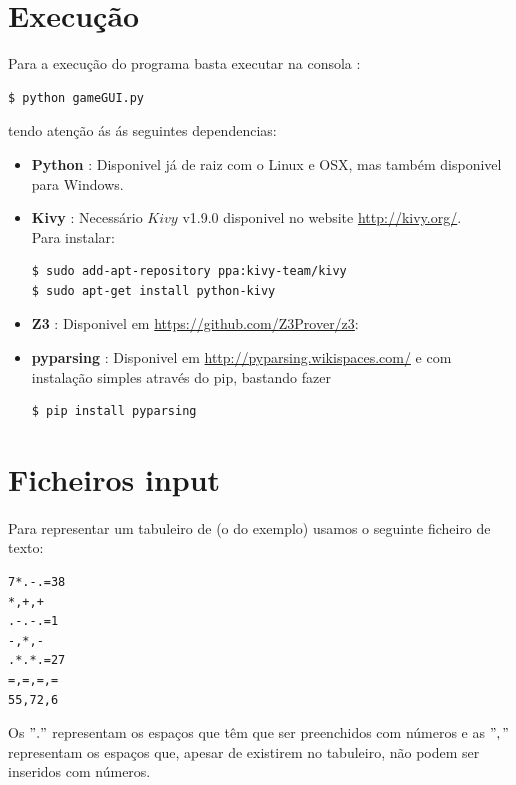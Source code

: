 \documentclass{article}
\begin{document}
\section{Execução}
Para a execução do programa basta executar na consola :
\begin{verbatim}
$ python gameGUI.py
\end{verbatim}

tendo atenção ás ás seguintes dependencias:
\begin{itemize}
\item{ {\bf{Python}} : Disponivel já de raiz com o Linux e OSX, mas também disponivel para Windows.}
\item{ {\bf{Kivy}} : Necessário $Kivy$ v1.9.0 disponivel no website {\url{http://kivy.org/}}.
\\
Para instalar:
\begin{verbatim}
$ sudo add-apt-repository ppa:kivy-team/kivy
$ sudo apt-get install python-kivy
\end{verbatim}
}
\item{ {\bf{Z3}} : Disponivel em {\url{https://github.com/Z3Prover/z3}}:}
\item{ {\bf{pyparsing}} :  Disponivel em {\url{http://pyparsing.wikispaces.com/}} e com instalação simples através do pip, bastando fazer 
\begin{verbatim}
$ pip install pyparsing
\end{verbatim}
}
\end{itemize}

\section{Ficheiros input}

\paragraph{} 

Para representar um tabuleiro de {} (o do exemplo) usamos o seguinte ficheiro de texto:
\begin{center}
\begin{verbatim}
7*.-.=38
*,+,+
.-.-.=1
-,*,-
.*.*.=27
=,=,=,=
55,72,6
\end{verbatim}
\end{center}

Os $"."$ representam os espaços que têm que ser preenchidos com números e as $","$ representam os espaços que, apesar de existirem no tabuleiro, não podem ser inseridos com números. 
\\
\end{document}
